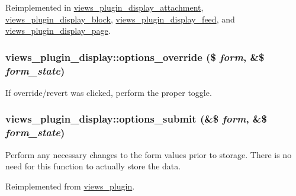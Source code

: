 Reimplemented in \hyperlink{classviews__plugin__display__attachment_82864b279fb83e8d9ebddc40bc2851fa}{views\_\-plugin\_\-display\_\-attachment}, \hyperlink{classviews__plugin__display__block_251f0aa56cead04c51c4b1d633826640}{views\_\-plugin\_\-display\_\-block}, \hyperlink{classviews__plugin__display__feed_be0a41d577b52de992279986d6c8c2d9}{views\_\-plugin\_\-display\_\-feed}, and \hyperlink{classviews__plugin__display__page_a8267a4774b92a7b47a3768ac98aac36}{views\_\-plugin\_\-display\_\-page}.\hypertarget{classviews__plugin__display_6628fc7addb8376633ff63889e37256e}{
\subsubsection[{options\_\-override}]{\setlength{\rightskip}{0pt plus 5cm}views\_\-plugin\_\-display::options\_\-override (\$ {\em form}, \/  \&\$ {\em form\_\-state})}}
\label{classviews__plugin__display_6628fc7addb8376633ff63889e37256e}


If override/revert was clicked, perform the proper toggle. \hypertarget{classviews__plugin__display_75f0b2d5587b365640fcb4d414daae36}{
\subsubsection[{options\_\-submit}]{\setlength{\rightskip}{0pt plus 5cm}views\_\-plugin\_\-display::options\_\-submit (\&\$ {\em form}, \/  \&\$ {\em form\_\-state})}}
\label{classviews__plugin__display_75f0b2d5587b365640fcb4d414daae36}


Perform any necessary changes to the form values prior to storage. There is no need for this function to actually store the data. 

Reimplemented from \hyperlink{classviews__plugin_442b0f392deb52725ec8159e05654e06}{views\_\-plugin}.

